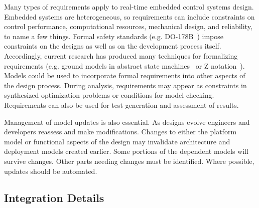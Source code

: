 


Many types of requirements apply to real-time embedded control systems design. Embedded systems are heterogeneous, so requirements can include constraints on control performance, computational resources, mechanical design, and reliability, to name a few things. Formal safety standards (e.g. DO-178B~\cite{DO178B}) impose constraints on the designs as well as on the development process itself.  Accordingly, current research has produced many techniques for formalizing requirements (e.g. ground models in abstract state machines~\cite{Borger} or Z notation~\cite{Z2}).  Models could be used to incorporate formal requirements into other aspects of the design process.  During analysis, requirements may appear as constraints in synthesized optimization problems or conditions for model checking.  Requirements can also be used for test generation and assessment of results.

Management of model updates is also essential. As designs evolve engineers and developers reassess and make modifications.  Changes to either the platform model or functional aspects of the design may invalidate architecture and deployment models created earlier.  Some portions of the dependent models will survive changes.  Other parts needing changes must be identified.  Where possible, updates should be automated.

\subsection{Integration Details}


